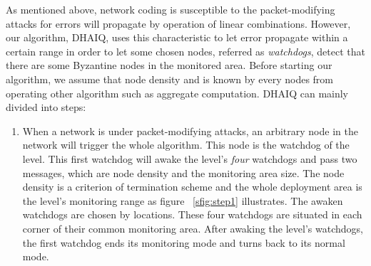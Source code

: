 \documentclass[conference]{IEEEtran}
\begin{document}
As mentioned above, network coding is susceptible to the packet-modifying attacks for errors will propagate by operation of linear combinations. However, our algorithm, DHAIQ, uses this characteristic to let error propagate within a certain range in order to let some chosen nodes, referred as \emph{watchdogs}, detect that there are some Byzantine nodes in the monitored area. Before starting our algorithm, we assume that node density and is known by every nodes from operating other algorithm such as aggregate computation. DHAIQ can mainly divided into  steps:\\
\begin{enumerate}
\item \label{st1}When a network is under packet-modifying attacks, an arbitrary node in the network will trigger the whole algorithm. This node is the watchdog of the  level. This first watchdog will awake the  level's \emph{four} watchdogs and pass two messages, which are node density and the monitoring area size. The node density is a criterion of termination scheme and the whole deployment area is the  level's monitoring range as figure ~\ref{sfig:step1} illustrates. The awaken watchdogs are chosen by locations. These four watchdogs are situated in each corner of their common monitoring area. After awaking the  level's watchdogs, the first watchdog ends its monitoring mode and turns back to its normal mode.\\

\end{enumerate}
\end{document}
